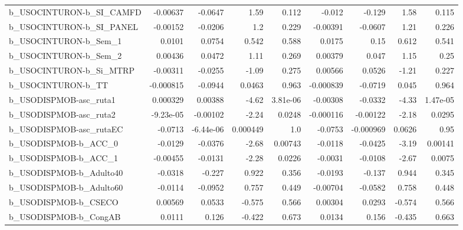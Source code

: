 \begin{tabular}{lrrrrrrrr}
b\_USOCINTURON-b\_SI\_CAMFD   &    -0.00637 &      -0.0647 &      1.59 &    0.112 &     -0.012 &      -0.129 &         1.58 &         0.115 \\
b\_USOCINTURON-b\_SI\_PANEL   &    -0.00152 &      -0.0206 &       1.2 &    0.229 &   -0.00391 &     -0.0607 &         1.21 &         0.226 \\
b\_USOCINTURON-b\_Sem\_1      &      0.0101 &       0.0754 &     0.542 &    0.588 &     0.0175 &        0.15 &        0.612 &         0.541 \\
b\_USOCINTURON-b\_Sem\_2      &     0.00436 &       0.0472 &      1.11 &    0.269 &    0.00379 &       0.047 &         1.15 &          0.25 \\
b\_USOCINTURON-b\_Si\_MTRP    &    -0.00311 &      -0.0255 &     -1.09 &    0.275 &    0.00566 &      0.0526 &        -1.21 &         0.227 \\
b\_USOCINTURON-b\_TT         &   -0.000815 &      -0.0944 &    0.0463 &    0.963 &  -0.000839 &     -0.0719 &        0.045 &         0.964 \\
b\_USODISPMOB-asc\_ruta1     &    0.000329 &      0.00388 &     -4.62 & 3.81e-06 &   -0.00308 &     -0.0332 &        -4.33 &      1.47e-05 \\
b\_USODISPMOB-asc\_ruta2     &   -9.23e-05 &     -0.00102 &     -2.24 &   0.0248 &  -0.000116 &    -0.00122 &        -2.18 &        0.0295 \\
b\_USODISPMOB-asc\_rutaEC    &     -0.0713 &    -6.44e-06 &  0.000449 &      1.0 &    -0.0753 &   -0.000969 &       0.0626 &          0.95 \\
b\_USODISPMOB-b\_ACC\_0       &     -0.0129 &      -0.0376 &     -2.68 &  0.00743 &    -0.0118 &     -0.0425 &        -3.19 &       0.00141 \\
b\_USODISPMOB-b\_ACC\_1       &    -0.00455 &      -0.0131 &     -2.28 &   0.0226 &    -0.0031 &     -0.0108 &        -2.67 &        0.0075 \\
b\_USODISPMOB-b\_Adulto40    &     -0.0318 &       -0.227 &     0.922 &    0.356 &    -0.0193 &      -0.137 &        0.944 &         0.345 \\
b\_USODISPMOB-b\_Adulto60    &     -0.0114 &      -0.0952 &     0.757 &    0.449 &   -0.00704 &     -0.0582 &        0.758 &         0.448 \\
b\_USODISPMOB-b\_CSECO       &     0.00569 &       0.0533 &    -0.575 &    0.566 &    0.00304 &      0.0293 &       -0.574 &         0.566 \\
b\_USODISPMOB-b\_CongAB      &      0.0111 &        0.126 &    -0.422 &    0.673 &     0.0134 &       0.156 &       -0.435 &         0.663 \\

\end{tabular}
